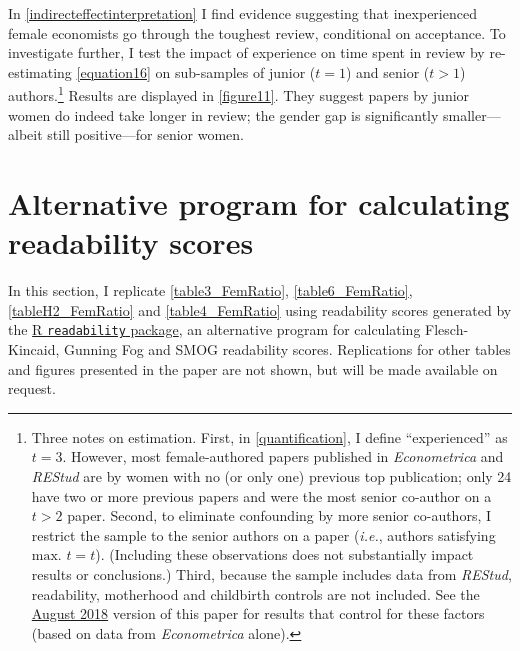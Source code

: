 \begin{appendices}
\begin{refsection}
In \autoref{indirecteffectinterpretation} I find evidence suggesting that inexperienced female economists go through the toughest review, conditional on acceptance. To investigate further, I test the impact of experience on time spent in review by re-estimating \autoref{equation16} on sub-samples of junior ($t=1$) and senior ($t>1$) authors.\footnote{Three notes on estimation. First, in \autoref{quantification}, I define ``experienced'' as $t=3$. However, most female-authored papers published in \emph{Econometrica} and \emph{REStud} are by women with no (or only one) previous top publication; only 24 have two or more previous papers and were the most senior co-author on a $t>2$ paper. Second, to eliminate confounding by more senior co-authors, I restrict the sample to the senior authors on a paper (\emph{i.e.}, authors satisfying $\text{max. } t=t$). (Including these observations does not substantially impact results or conclusions.) Third, because the sample includes data from \emph{REStud}, readability, motherhood and childbirth controls are not included. See the \href{http://www.erinhengel.com/research/publishing_female20180828.pdf}{August 2018} version of this paper for results that control for these factors (based on data from \emph{Econometrica} alone).} Results are displayed in \autoref{figure11}. They suggest papers by junior women do indeed take longer in review; the gender gap is significantly smaller---albeit still positive---for senior women.



\clearpage

\section{Alternative program for calculating readability scores}
\label{appendixalternativereadability}

In this section, I replicate \autoref{table3_FemRatio}, \autoref{table6_FemRatio}, \autoref{tableH2_FemRatio} and \autoref{table4_FemRatio} using readability scores generated by the \href{https://github.com/trinker/readability}{R \texttt{readability} package}, an alternative program for calculating Flesch-Kincaid, Gunning Fog and SMOG readability scores. Replications for other tables and figures presented in the paper are not shown, but will be made available on request.


\end{refsection}
\end{appendices}
